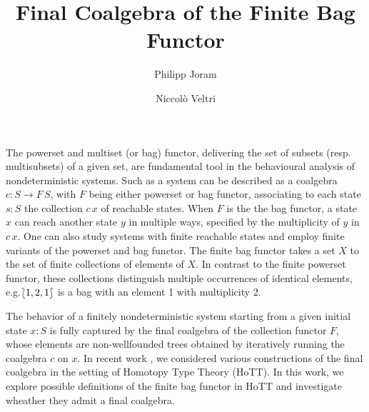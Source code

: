 \documentclass{easychair}
\begin{document}
  \title{Final Coalgebra of the Finite Bag Functor}
  \author{%
      Philipp Joram \and
      Niccol{\`o} Veltri%
  }

  \maketitle


  The powerset and multiset (or bag) functor, delivering the set of
  subsets (resp. multisubsets) of a given set, are fundamental tool in
  the behavioural analysis of nondeterministic systems. Such as a
  system can be described as a coalgebra $c : S \to F\, S$, with $F$
  being either powerset or bag functor, associating to each state $s :
  S$ the collection $c \, x$ of reachable states. When $F$ is the the
  bag functor, a state $x$ can reach another state $y$ in multiple
  ways, specified by the multiplicity of $y$ in $c\,x$. One can also
  study systems with finite reachable states and employ finite
  variants of the powerset and bag functor.  The finite bag functor
  takes a set $X$ to the set of finite collections of elements of
  $X$.  In contrast to the finite powerset functor, these collections
  distinguish multiple occurrences of identical elements, e.g.\@ $\Bag[1,
    2, 1]$ is a bag with an element 1 with multiplicity 2.
  
  The behavior of a finitely nondeterministic system starting from a
  given initial state $x : S$ is fully captured by the final coalgebra
  of the collection functor $F$, whose elements are non-wellfounded
  trees obtained by iteratively running the coalgebra $c$ on $x$. In
  recent work \cite{Veltri2021}, we considered various constructions
  of the final coalgebra in the setting of Homotopy Type Theory
  (HoTT). In this work, we explore possible definitions of the finite
  bag functor in HoTT and investigate wheather they admit a final coalgebra.

\end{document}
